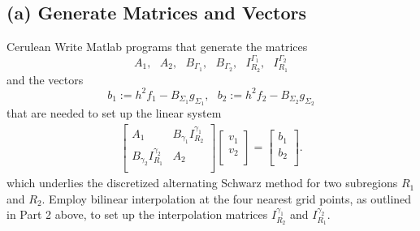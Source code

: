 \documentclass[12pt]{article}
\begin{document}
\subsection{(a) Generate Matrices and Vectors}\begin{mybox}{Cerulean}{}
Write Matlab programs that generate the matrices
$$A_1, \text{ } A_2,\text{ } B_{\Gamma_1}, \text{ } B_{\Gamma_2}, \text{ } I_{R_2}^{\Gamma_1}, \text{ } I_{R_1}^{\Gamma_2}$$
and the vectors
$$b_1:= h^2f_1 - B_{\Sigma_1}g_{\Sigma_1}, \text{ } b_2:= h^2f_2 - B_{\Sigma_2}g_{\Sigma_2}$$
that are needed to set up the linear system
\begin{align*}
\begin{bmatrix}
A_1 & B_{\gamma_1}I_{R_2}^{\gamma_1} \\
 B_{\gamma_2}I_{R_1}^{\gamma_2} & A_2 \\
\end{bmatrix} \begin{bmatrix}
				v_1 \\
				v_2 \\
				\end{bmatrix} = \begin{bmatrix}
								b_1 \\
								b_2 \\
								\end{bmatrix}. \tag{6}
\end{align*}
which underlies the discretized alternating Schwarz method for two subregions $R_1$ and $R_2$.  Employ bilinear interpolation at the four nearest grid points, as outlined in Part 2 above, to set up the interpolation matrices $I_{R_2}^{\gamma_1}$ and $I_{R_1}^{\gamma_2}$.\\
\end{mybox}\text{ }\\
\end{document}
